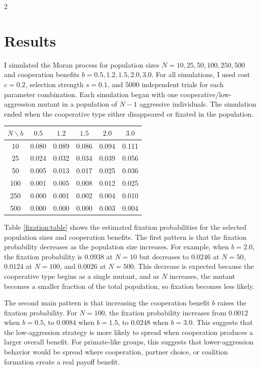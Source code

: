 \documentclass[11pt]{article}
\begin{document}
\begin{multicols}{2}
\section{Results}

I simulated the Moran process for population sizes $N=10,25,50,100,250,500$ and cooperation benefits $b=0.5,1.2,1.5,2.0,3.0$. For all simulations, I used cost $c=0.2$, selection strength $s=0.1$, and $5000$ independent trials for each parameter combination. Each simulation began with one cooperative/low-aggression mutant in a population of $N-1$ aggressive individuals. The simulation ended when the cooperative type either disappeared or fixated in the population. 

\begin{center}
\small
  \begin{tabular}{c|ccccc}
    \hline
       $N \backslash b$ & $0.5$ & $1.2$ & $1.5$ & $2.0$ & $3.0$ \\ \hline 
       10  & 0.080 & 0.089 & 0.086 & 0.094 & 0.111 \\
       25  & 0.024 & 0.032 & 0.034 & 0.039 & 0.056 \\
       50  & 0.005 & 0.013 & 0.017 & 0.025 & 0.036 \\
       100 & 0.001 & 0.005 & 0.008 & 0.012 & 0.025 \\
       250 & 0.000 & 0.001 & 0.002 & 0.004 & 0.010 \\
       500 & 0.000 & 0.000 & 0.000 & 0.003 & 0.004 \\
    \hline
  \end{tabular}
  \label{fixation:table}
\end{center}

Table \ref{fixation:table} shows the estimated fixation probabilities for the selected population sizes and cooperation benefits. The first pattern is that the fixation probability decreases as the population size increases. For example, when $b=2.0$, the fixation probability is $0.0938$ at $N=10$ but decreases to $0.0246$ at $N=50$, $0.0124$ at $N=100$, and $0.0026$ at $N=500$. This decrease is expected because the cooperative type begins as a single mutant, and as $N$ increases, the mutant becomes a smaller fraction of the total population, so fixation becomes less likely. 

The second main pattern is that increasing the cooperation benefit $b$ raises the fixation probability. For $N=100$, the fixation probability increases from $0.0012$ when $b=0.5$, to $0.0084$ when $b=1.5$, to $0.0248$ when $b=3.0$. This suggests that the low-aggression strategy is more likely to spread when cooperation produces a larger overall benefit. For primate-like groups, this suggests that lower-aggression behavior would be spread where cooperation, partner choice, or coalition formation create a real payoff benefit.


\end{multicols}
\end{document}
